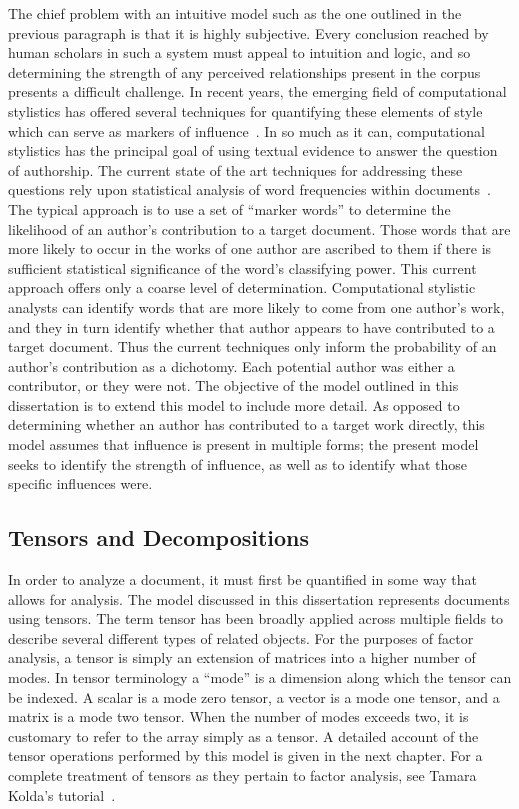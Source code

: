 \documentclass[../ut-dissertation.tex]{subfiles}
\begin{document}
The chief problem with an intuitive model such as the one outlined in
the previous paragraph is that it is highly subjective.  Every
conclusion reached by human scholars in such a system must appeal to
intuition and logic, and so determining the strength of any perceived
relationships present in the corpus presents a difficult challenge.
In recent years, the emerging field of computational stylistics has
offered several techniques for quantifying these elements of style
which can serve as markers of influence~\cite{bader2007, craig2009,
  burrows2017}.  In so much as it can, computational stylistics has
the principal goal of using textual evidence to answer the question of
authorship.  The current state of the art techniques for addressing
these questions rely upon statistical analysis of word frequencies
within documents~\cite{craig2009}.  The typical approach is to use a
set of ``marker words'' to determine the likelihood of an author's
contribution to a target document.  Those words that are more likely
to occur in the works of one author are ascribed to them if there is
sufficient statistical significance of the word's classifying power.
This current approach offers only a coarse level of determination.
Computational stylistic analysts can identify words that are more
likely to come from one author's work, and they in turn identify
whether that author appears to have contributed to a target document.
Thus the current techniques only inform the probability of an author's
contribution as a dichotomy.  Each potential author was either a
contributor, or they were not.  The objective of the model outlined in
this dissertation is to extend this model to include more detail.  As
opposed to determining whether an author has contributed to a target
work directly, this model assumes that influence is present in
multiple forms; the present model seeks to identify the strength of
influence, as well as to identify what those specific influences were.

\subsection{Tensors and Decompositions}
In order to analyze a document, it must first be quantified in some
way that allows for analysis.  The model discussed in this
dissertation represents documents using tensors.  The term tensor has
been broadly applied across multiple fields to describe several
different types of related objects.  For the purposes of factor
analysis, a tensor is simply an extension of matrices into a higher
number of modes. In tensor terminology a ``mode'' is a dimension along
which the tensor can be indexed.  A scalar is a mode zero tensor, a
vector is a mode one tensor, and a matrix is a mode two tensor.  When
the number of modes exceeds two, it is customary to refer to the array
simply as a tensor.  A detailed account of the tensor operations
performed by this model is given in the next chapter.  For a complete
treatment of tensors as they pertain to factor analysis, see Tamara
Kolda's tutorial~\cite{kolda2009}.
\end{document}
